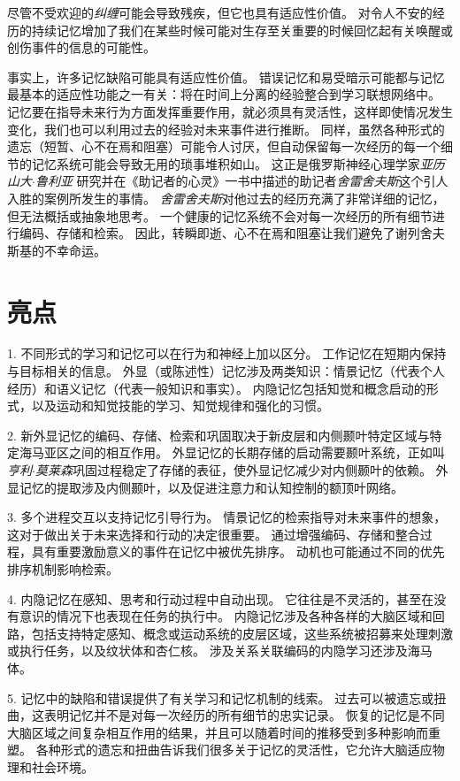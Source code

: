 尽管不受欢迎的\textit{纠缠}可能会导致残疾，但它也具有适应性价值。
对令人不安的经历的持续记忆增加了我们在某些时候可能对生存至关重要的时候回忆起有关唤醒或创伤事件的信息的可能性。


事实上，许多记忆缺陷可能具有适应性价值。
错误记忆和易受暗示可能都与记忆最基本的适应性功能之一有关：将在时间上分离的经验整合到学习联想网络中。
记忆要在指导未来行为方面发挥重要作用，就必须具有灵活性，这样即使情况发生变化，我们也可以利用过去的经验对未来事件进行推断。
同样，虽然各种形式的遗忘（短暂、心不在焉和阻塞）可能令人讨厌，但自动保留每一次经历的每一个细节的记忆系统可能会导致无用的琐事堆积如山。
这正是俄罗斯神经心理学家\textit{亚历山大$\cdot$鲁利亚} 研究并在《助记者的心灵》一书中描述的助记者\textit{舍雷舍夫斯}这个引人入胜的案例所发生的事情。
\textit{舍雷舍夫斯}对他过去的经历充满了非常详细的记忆，但无法概括或抽象地思考。
一个健康的记忆系统不会对每一次经历的所有细节进行编码、存储和检索。
因此，转瞬即逝、心不在焉和阻塞让我们避免了谢列舍夫斯基的不幸命运。



\section{亮点}

1. 不同形式的学习和记忆可以在行为和神经上加以区分。 工作记忆在短期内保持与目标相关的信息。
外显（或陈述性）记忆涉及两类知识：情景记忆（代表个人经历）和语义记忆（代表一般知识和事实）。
内隐记忆包括知觉和概念启动的形式，以及运动和知觉技能的学习、知觉规律和强化的习惯。 


2. 新外显记忆的编码、存储、检索和巩固取决于新皮层和内侧颞叶特定区域与特定海马亚区之间的相互作用。
外显记忆的长期存储的启动需要颞叶系统，正如叫\textit{亨利$\cdot$莫莱森}巩固过程稳定了存储的表征，使外显记忆减少对内侧颞叶的依赖。
外显记忆的提取涉及内侧颞叶，以及促进注意力和认知控制的额顶叶网络。


3. 多个进程交互以支持记忆引导行为。
情景记忆的检索指导对未来事件的想象，这对于做出关于未来选择和行动的决定很重要。
通过增强编码、存储和整合过程，具有重要激励意义的事件在记忆中被优先排序。
动机也可能通过不同的优先排序机制影响检索。 


4. 内隐记忆在感知、思考和行动过程中自动出现。
它往往是不灵活的，甚至在没有意识的情况下也表现在任务的执行中。
内隐记忆涉及各种各样的大脑区域和回路，包括支持特定感知、概念或运动系统的皮层区域，这些系统被招募来处理刺激或执行任务，以及纹状体和杏仁核。
涉及关系关联编码的内隐学习还涉及海马体。


5. 记忆中的缺陷和错误提供了有关学习和记忆机制的线索。
过去可以被遗忘或扭曲，这表明记忆并不是对每一次经历的所有细节的忠实记录。
恢复的记忆是不同大脑区域之间复杂相互作用的结果，并且可以随着时间的推移受到多种影响而重塑。
各种形式的遗忘和扭曲告诉我们很多关于记忆的灵活性，它允许大脑适应物理和社会环境。


